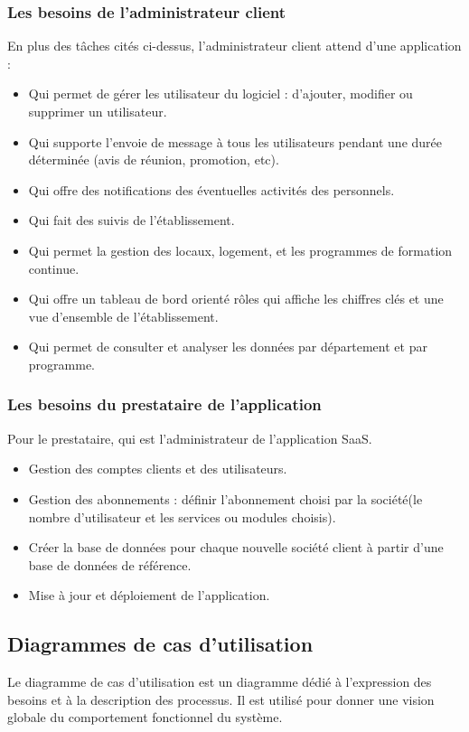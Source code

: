 \subsubsection{Les besoins de l'administrateur client}
En plus des tâches cités ci-dessus, l'administrateur client attend d'une application : 
\begin{itemize}
	\item Qui permet de gérer les utilisateur du logiciel : d'ajouter, modifier ou supprimer un utilisateur.
	\item Qui supporte l'envoie de message à tous les utilisateurs pendant une durée déterminée (avis de réunion, promotion, etc).
	\item Qui offre des notifications des éventuelles activités des personnels.
	\item Qui fait des suivis de l'établissement.
	\item Qui permet la gestion des locaux, logement, et les programmes de formation continue.
	\item Qui offre un tableau de bord orienté rôles qui affiche les chiffres clés et une vue d'ensemble de l'établissement.
	\item Qui permet de consulter et analyser les données par département et par programme.
\end{itemize}

\subsubsection{Les besoins du prestataire de l'application}
Pour le  prestataire, qui est l'administrateur de l'application SaaS.
\begin{itemize}
	\item Gestion des comptes clients et des utilisateurs.
	\item Gestion des abonnements : définir l'abonnement choisi par la société(le nombre d'utilisateur et les services ou modules choisis).
	\item Créer la base de données pour chaque nouvelle société client à partir d'une base de données de référence.
	\item Mise à jour et déploiement de l'application.
\end{itemize}
\medskip

\subsection{Diagrammes de cas d'utilisation}
Le diagramme de cas d'utilisation est un diagramme dédié à l'expression des besoins et à la description des processus. Il est utilisé pour donner une vision globale du comportement fonctionnel du système.
\medskip

